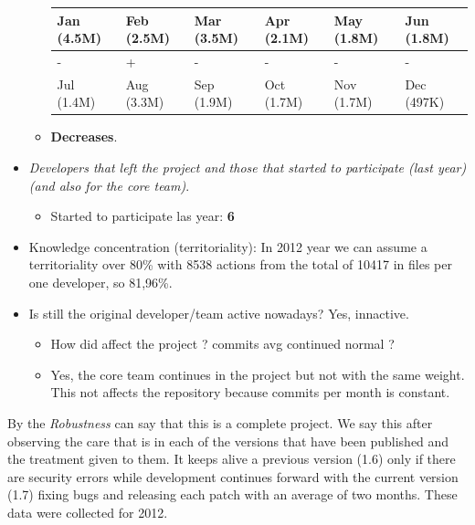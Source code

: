 \documentclass[11pt]{scrartcl}
\begin{document}
\begin{itemize}
\begin{itemize}
            \begin{tabular}{|l|l|l|l|l|l|}
                \hline
        	    Jan (4.5M) & Feb (2.5M) & Mar (3.5M) & Apr (2.1M) & May (1.8M) & Jun (1.8M)\\
        	    \hline
        	    - & + & - & - & - & -\\
                \hline
                Jul (1.4M) & Aug (3.3M) & Sep (1.9M) & Oct (1.7M) & Nov (1.7M) & Dec (497K)\\
                \hline
            \end{tabular}
        \item \textbf{Decreases}.
    \end{itemize}
    \item \emph{Developers that left the project and those that started to participate (last year) (and also for the core team)}.
    \begin{itemize}
        \item Started to participate las year: \textbf{6}
    \end{itemize}
	    \item Knowledge concentration (territoriality): In 2012 year we can assume a territoriality over 80\% with 8538 actions from the total of 10417 in files per one developer, so 81,96\%.
    \item Is still the original developer/team active nowadays? Yes, innactive.
    \begin{itemize}
        \item How did affect the project ? commits avg continued normal ?
        \item Yes, the core team continues in the project but not with the same weight. This not affects the repository because commits per month is constant.
    \end{itemize}
\end{itemize}

\par By the \emph{Robustness} can say that this is a complete project. We say this after observing the care that is in each of the versions that have been published and the treatment given to them. It keeps alive a previous version (1.6) only if there are security errors while development continues forward with the current version (1.7) fixing bugs and releasing each patch with an average of two months. These data were collected for 2012.
\end{document}
